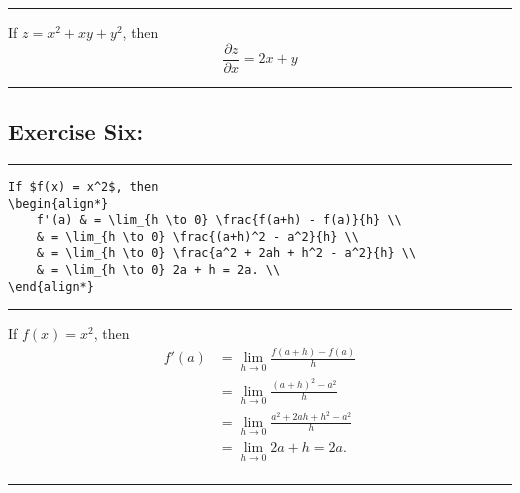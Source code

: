 \documentclass{article} %
\newcommand{\linediv}{\noindent\rule{6.5in}{2pt}}
\newcommand{\linedivm}{\noindent\rule{6.5in}{1pt}}
\begin{document}
\linedivm

\newcommand{\pder}[2]{\frac{\partial #1}{\partial #2}}

If $z = x^2 + xy + y^2$, then
$$
\pder{z}{x} = 2x + y
$$

\linediv
 
\subsection*{Exercise Six:}
    
\linediv

\begin{verbatim}
If $f(x) = x^2$, then
\begin{align*}
    f'(a) & = \lim_{h \to 0} \frac{f(a+h) - f(a)}{h} \\
    & = \lim_{h \to 0} \frac{(a+h)^2 - a^2}{h} \\
    & = \lim_{h \to 0} \frac{a^2 + 2ah + h^2 - a^2}{h} \\
    & = \lim_{h \to 0} 2a + h = 2a. \\
\end{align*}
\end{verbatim}

\linedivm

If $f(x) = x^2$, then
\begin{align*}
    f'(a) & = \lim_{h \to 0} \frac{f(a+h) - f(a)}{h} \\
    & = \lim_{h \to 0} \frac{(a+h)^2 - a^2}{h} \\
    & = \lim_{h \to 0} \frac{a^2 + 2ah + h^2 - a^2}{h} \\
    & = \lim_{h \to 0} 2a + h = 2a. \\
\end{align*}

\linediv
\end{document}

